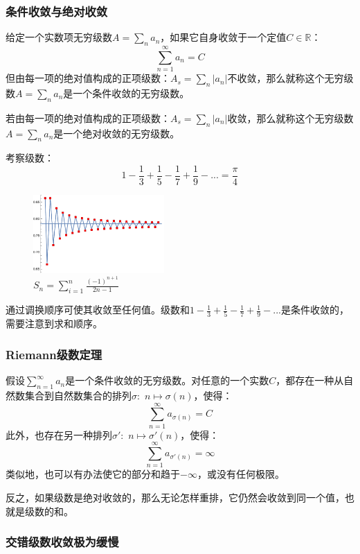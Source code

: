 \subsubsection{条件收敛与绝对收敛}

给定一个实数项无穷级数$A = \sum_{n} a_n$，如果它自身收敛于一个定值$C \in \mathbb{R}$：
\[ \sum_{n=1}^\infty a_n = C\]
但由每一项的绝对值构成的正项级数：$A_s = \sum_{n} | a_n |$不收敛，那么就称这个无穷级数$A = \sum_{n} a_n$是一个条件收敛的无穷级数。

若由每一项的绝对值构成的正项级数：$A_s = \sum_{n} | a_n |$收敛，那么就称这个无穷级数$A = \sum_{n} a_n$是一个绝对收敛的无穷级数。

考察级数：
\[1-\frac{1}{3}+\frac{1}{5}-\frac{1}{7}+\frac{1}{9}-... = \frac{\pi}{4}\]
\begin{figure}
	\centering
	\includegraphics[width=5cm]{Figures/sum.pdf}
	\caption{$S_n=\sum_{i=1}^{n}\frac{(-1)^{n+1}}{2n-1}$}
	\label{sumjc}
\end{figure}
通过调换顺序可使其收敛至任何值。级数和$1-\frac{1}{3}+\frac{1}{5}-\frac{1}{7}+\frac{1}{9}-...$是条件收敛的，需要注意到求和顺序。

\subsubsection{Riemann级数定理}
\begin{theorem}
	假设$\sum_{n=1}^\infty a_n$是一个条件收敛的无穷级数。对任意的一个实数$C$，都存在一种从自然数集合到自然数集合的排列$\sigma : \, \, n \mapsto \sigma (n)$，使得：
	\[\sum_{n=1}^\infty a_{\sigma (n)} = C\]
	此外，也存在另一种排列$\sigma' : \, \, n \mapsto \sigma' (n)$，使得：
	\[\sum_{n=1}^\infty a_{\sigma' (n)} = \infty\]
	类似地，也可以有办法使它的部分和趋于$-\infty$，或没有任何极限。
	
	反之，如果级数是绝对收敛的，那么无论怎样重排，它仍然会收敛到同一个值，也就是级数的和。
\end{theorem}


\subsubsection{交错级数收敛极为缓慢}

